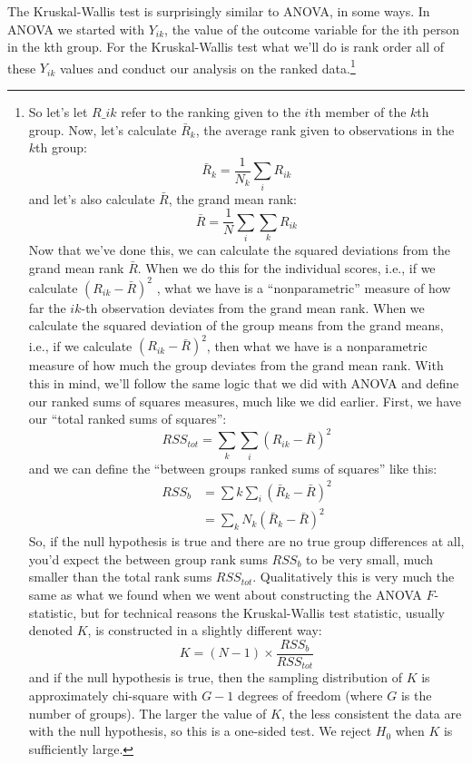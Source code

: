 \documentclass[
  a4paper,
]{book}
\begin{document}
The Kruskal-Wallis test is surprisingly similar to ANOVA, in some ways.
In ANOVA we started with \(Y_{ik}\), the value of the outcome variable
for the ith person in the kth group. For the Kruskal-Wallis test what
we'll do is rank order all of these \(Y_{ik}\) values and conduct our
analysis on the ranked data.\footnote{So let's let \(R\_{ik}\) refer to
  the ranking given to the \(i\)th member of the \(k\)th group. Now,
  let's calculate \(\bar{R}_k\), the average rank given to observations
  in the \(k\)th group: \[\bar{R}_k=\frac{1}{N_k}\sum_i R_{ik}\] and
  let's also calculate \(\bar{R}\), the grand mean rank:
  \[\bar{R}=\frac{1}{N}\sum_i\sum_k R_{ik}\] Now that we've done this,
  we can calculate the squared deviations from the grand mean rank
  \(\bar{R}\). When we do this for the individual scores, i.e., if we
  calculate \((R_{ik} - \bar{R})^2\) , what we have is a
  ``nonparametric'' measure of how far the \(ik\)-th observation
  deviates from the grand mean rank. When we calculate the squared
  deviation of the group means from the grand means, i.e., if we
  calculate \((R_{ik} - \bar{R})^2\), then what we have is a
  nonparametric measure of how much the group deviates from the grand
  mean rank. With this in mind, we'll follow the same logic that we did
  with ANOVA and define our ranked sums of squares measures, much like
  we did earlier. First, we have our ``total ranked sums of squares'':
  \[RSS_{tot}=\sum_k\sum_i (R_{ik}-\bar{R})^2\] and we can define the
  ``between groups ranked sums of squares'' like this:
  \[\begin{aligned} RSS_{b}& =\sum{k}\sum_{i}(\bar{R}_{k}-\bar{R})^2 \\ &= \sum_{k} N_k (\bar{R}_{k}-\bar{R})^2 \end{aligned}\]
  So, if the null hypothesis is true and there are no true group
  differences at all, you'd expect the between group rank sums \(RSS_b\)
  to be very small, much smaller than the total rank sums \(RSS_{tot}\).
  Qualitatively this is very much the same as what we found when we went
  about constructing the ANOVA \(F\)-statistic, but for technical
  reasons the Kruskal-Wallis test statistic, usually denoted \(K\), is
  constructed in a slightly different way:
  \[K=(N-1) \times \frac{RSS_b}{RSS_{tot}}\] and if the null hypothesis
  is true, then the sampling distribution of \(K\) is approximately
  chi-square with \(G-1\) degrees of freedom (where \(G\) is the number
  of groups). The larger the value of \(K\), the less consistent the
  data are with the null hypothesis, so this is a one-sided test. We
  reject \(H_0\) when \(K\) is sufficiently large.}
\end{document}
